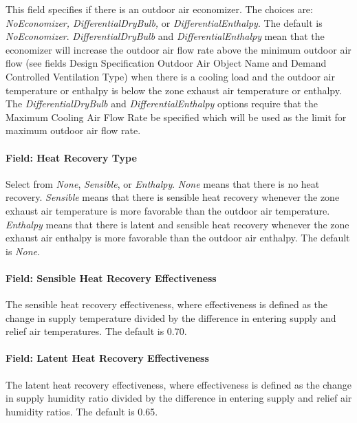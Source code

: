 This field specifies if there is an outdoor air economizer. The choices are: \emph{NoEconomizer, DifferentialDryBulb,} or \emph{DifferentialEnthalpy}. The default is \emph{NoEconomizer}. \emph{DifferentialDryBulb} and \emph{DifferentialEnthalpy} mean that the economizer will increase the outdoor air flow rate above the minimum outdoor air flow (see fields Design Specification Outdoor Air Object Name and Demand Controlled Ventilation Type) when there is a cooling load and the outdoor air temperature or enthalpy is below the zone exhaust air temperature or enthalpy. The \emph{DifferentialDryBulb} and \emph{DifferentialEnthalpy} options require that the Maximum Cooling Air Flow Rate be specified which will be used as the limit for maximum outdoor air flow rate.

\paragraph{Field: Heat Recovery Type}\label{field-heat-recovery-type}

Select from \emph{None}, \emph{Sensible}, or \emph{Enthalpy}. \emph{None} means that there is no heat recovery. \emph{Sensible} means that there is sensible heat recovery whenever the zone exhaust air temperature is more favorable than the outdoor air temperature. \emph{Enthalpy} means that there is latent and sensible heat recovery whenever the zone exhaust air enthalpy is more favorable than the outdoor air enthalpy. The default is \emph{None}.

\paragraph{Field: Sensible Heat Recovery Effectiveness}\label{field-sensible-heat-recovery-effectiveness}

The sensible heat recovery effectiveness, where effectiveness is defined as the change in supply temperature divided by the difference in entering supply and relief air temperatures. The default is 0.70.

\paragraph{Field: Latent Heat Recovery Effectiveness}\label{field-latent-heat-recovery-effectiveness}

The latent heat recovery effectiveness, where effectiveness is defined as the change in supply humidity ratio divided by the difference in entering supply and relief air humidity ratios. The default is 0.65.

